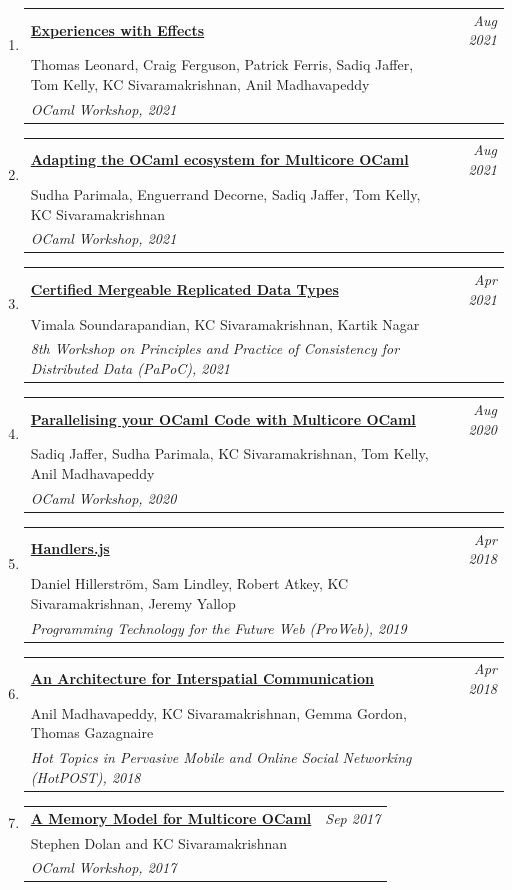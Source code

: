 \documentclass[10pt]{article}
\makeatletter
\newcommand{\lbar}[1]{{\color{#1}\ding{118}}\hspace*{2pt}}
\newenvironment{benumerate}[2]{
    \let\oldItem\item
    \def\item{\addtocounter{enumi}{-2}\oldItem}
    \begin{enumerate}[#2] \itemsep3pt
    \setcounter{enumi}{#1}
    \addtocounter{enumi}{1}}
  {\end{enumerate}}
\newenvironment{publication}[5]
{ \item
  \begin{tabular*}{7.5in}{p{6.3in}@{\extracolsep{\fill}}r}
    \href{#1}{\textbf{#2}} & \textit{#3}\\ #4 &\\ \textit{#5}&\\
  \end{tabular*}
} {}
\newenvironment{region}[3]{%
  \Needspace{7\baselineskip}
  \vspace*{0.5ex}
  {\scalebox{1.4}{\textbf{#1}}}
  \begin{benumerate}{#3}{\color{RoyalBlue}#2}}
  {\end{benumerate}\vspace{0.8ex}}
\makeatother
\begin{document}
\begin{region} {\lbar{purple}Workshop Publications}{{W}1}{26}
	\begin{publication}{https://kcsrk.info/papers/ocaml2021b.pdf}
		{Experiences with Effects}
		{Aug 2021}{Thomas Leonard, Craig Ferguson, Patrick Ferris, Sadiq Jaffer, Tom Kelly, KC Sivaramakrishnan, Anil Madhavapeddy}
		{OCaml Workshop, 2021}
	\end{publication}

	\begin{publication}{https://kcsrk.info/papers/ocaml2021c.pdf}
		{Adapting the OCaml ecosystem for Multicore OCaml}
		{Aug 2021}{Sudha Parimala, Enguerrand Decorne, Sadiq Jaffer, Tom Kelly, KC Sivaramakrishnan}
		{OCaml Workshop, 2021}
	\end{publication}

	\begin{publication}{http://kcsrk.info/papers/papoc21.pdf}
		{Certified Mergeable Replicated Data Types}
		{Apr 2021}{Vimala Soundarapandian, KC Sivaramakrishnan, Kartik Nagar}
		{8th Workshop on Principles and Practice of Consistency for Distributed Data (PaPoC), 2021}
	\end{publication}

	\begin{publication}{https://kcsrk.info/papers/multicore-ocaml20.pdf}
		{Parallelising your OCaml Code with Multicore OCaml}
		{Aug 2020}{Sadiq Jaffer, Sudha Parimala, KC Sivaramakrishnan, Tom Kelly, Anil Madhavapeddy}
		{OCaml Workshop, 2020}
	\end{publication}

	\begin{publication}{http://kcsrk.info/papers/handlers_js-proweb2018.pdf}
		{Handlers.js}
		{Apr 2018}{Daniel Hillerström, Sam Lindley, Robert Atkey, KC Sivaramakrishnan, Jeremy Yallop}
		{Programming Technology for the Future Web (ProWeb), 2019}
	\end{publication}

	\begin{publication}{http://kcsrk.info/papers/osmose_feb_18.pdf}
		{An Architecture for Interspatial Communication}
		{Apr 2018}{Anil Madhavapeddy, KC Sivaramakrishnan, Gemma Gordon, Thomas Gazagnaire}
    {Hot Topics in Pervasive Mobile and Online Social Networking (HotPOST), 2018}
  \end{publication}

  \begin{publication}{http://kcsrk.info/papers/memory_model_ocaml17.pdf}
    {A Memory Model for Multicore OCaml}
    {Sep 2017}{Stephen Dolan and KC Sivaramakrishnan}
    {OCaml Workshop, 2017}
  \end{publication}


\end{region}
\end{document}
